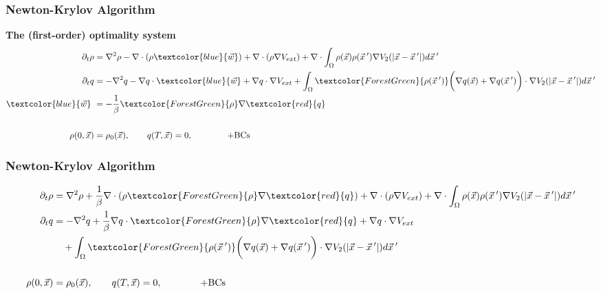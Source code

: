 \documentclass[aspectratio=169,xcolor=dvipsnames]{beamer}
\begin{document}
\begin{frame}
	\frametitle{Newton-Krylov Algorithm}
	\textbf{The (first-order) optimality system}\\
	\begin{align*}
		\partial_t \rho &= \nabla^2 \rho - \nabla \cdot (\rho \textcolor{blue}{\vec{w}}) + \nabla \cdot \left(\rho \nabla V_{ext}\right)
		+ \nabla \cdot \int_\Omega \rho(\vec{x}) \rho(\vec{x}\hspace{0.2em}') \nabla V_2(|\vec{x}-\vec{x}\hspace{0.2em}'|)d\vec{x}\hspace{0.2em}'  \\
		\partial_t q &= -\nabla^2 q - \nabla q \cdot \textcolor{blue}{\vec{w}} + \nabla q \cdot \nabla V_{ext} + \int_\Omega \textcolor{ForestGreen}{\rho(\vec{x}\hspace{0.2em}')} \bigg(\nabla q(\vec{x}) + \nabla q(\vec{x}\hspace{0.2em}')\bigg)\cdot  \nabla V_2(|\vec{x}-\vec{x}\hspace{0.2em}'|)d\vec{x}\hspace{0.2em}' \\
		\textcolor{blue}{\vec{w}} \ &= - \frac{1}{\beta}\textcolor{ForestGreen}{\rho} \nabla  \textcolor{red}{q}\\
		\\
		\rho(0,\vec{x})&=\rho_0(\vec{x}), \qquad q(T,\vec{x})= 0, \qquad \qquad \text{+BCs}\\
	\end{align*}
\end{frame}
\begin{frame}
	\frametitle{Newton-Krylov Algorithm}

	\begin{align*}
		\partial_t \rho &= \nabla^2 \rho + \frac{1}{\beta}\nabla \cdot (\rho  \textcolor{ForestGreen}{\rho} \nabla  \textcolor{red}{q}) + \nabla \cdot \left(\rho \nabla V_{ext}\right)
		+ \nabla \cdot \int_\Omega \rho(\vec{x}) \rho(\vec{x}\hspace{0.2em}') \nabla V_2(|\vec{x}-\vec{x}\hspace{0.2em}'|)d\vec{x}\hspace{0.2em}'  \\
		\partial_t q &= -\nabla^2 q + \frac{1}{\beta}\nabla q \cdot  \textcolor{ForestGreen}{\rho} \nabla  \textcolor{red}{q}  + \nabla q \cdot \nabla V_{ext} \\
		& \quad+ \int_\Omega \textcolor{ForestGreen}{\rho(\vec{x}\hspace{0.2em}')} \bigg(\nabla q(\vec{x}) + \nabla q(\vec{x}\hspace{0.2em}')\bigg)\cdot  \nabla V_2(|\vec{x}-\vec{x}\hspace{0.2em}'|)d\vec{x}\hspace{0.2em}' \\
		\\
		\rho(0,\vec{x})&=\rho_0(\vec{x}), \qquad q(T,\vec{x})= 0, \qquad \qquad \text{+BCs}\\
	\end{align*}
\end{frame}
\end{document}
